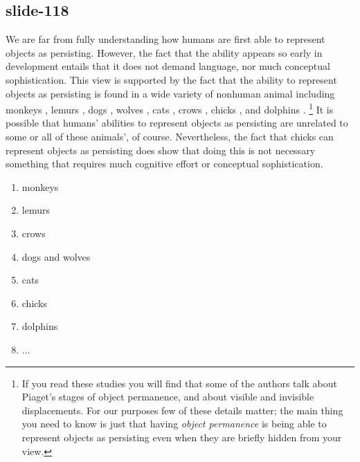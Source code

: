 \documentclass[12pt,\papersize]{extarticle}
\begin{document}
\subsection{slide-118}
We are far from fully understanding how humans are first able to represent
objects as persisting.
However, the fact that the ability appears so early in development entails
that it does not demand language, nor much conceptual sophistication.
This view is supported by the fact that the ability to represent objects as
persisting is found in a wide variety of nonhuman animal including
monkeys \citep{santos:2006_cotton-top},
lemurs \citep{deppe:2009_object},
dogs \citep{kundey:2010_domesticated}, %
wolves \citep{fiset:2013_object}, %
cats \citep{triana:1981_object},
crows \citep{hoffmann:2011_ontogeny},
chicks \citep{chiandetti:2011_chicks_op},
and 
dolphins \citep{jaakkola:2010_what}.%
\footnote{
If you read these studies you will find that some of the authors talk about
Piaget's stages of object permanence, and about visible and invisible
displacements.
For our purposes few of these details matter;
the main thing you need to know is just that having \emph{object permanence} is being able to represent objects as persisting even when they are briefly hidden from your view.
}
It is possible that humans’ abilities to represent objects as persisting
are unrelated to some or all of these animals’, of course.
Nevertheless, the fact that chicks can represent objects as persisting does
show that doing this is not necessary something that requires much
cognitive effort or conceptual sophistication.
 
\begin{enumerate}
 
\item monkeys \citep{santos:2006_cotton-top}
 
\item lemurs \citep{deppe:2009_object}
 
\item crows \citep{hoffmann:2011_ontogeny}
 
\item dogs and wolves \citep{fiset:2013_object}
 
\item cats \citep{triana:1981_object}
 
\item chicks \citep{chiandetti:2011_chicks_op}
 
\item dolphins \citep{jaakkola:2010_what}
 
\item ...
 
\end{enumerate}
 
\end{document}
